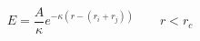 \documentclass[12pt]{article}
\begin{document}
$$
   E = \frac{A}{\kappa} e^{- \kappa (r - (r_i + r_j))} \qquad r < r_c
$$
\end{document}
